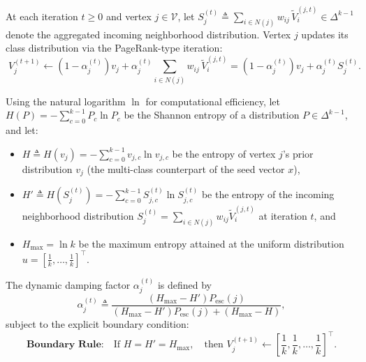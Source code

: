 \documentclass[11pt, a4paper]{article}
\theoremstyle{definition}
\theoremstyle{definition}
\begin{document}
At each iteration $t \ge 0$ and vertex $j \in \mathcal{V}$, let $S_j^{(t)} \triangleq \sum_{i \in N(j)} w_{ij}\,\tilde{V}_i^{(j,t)} \in \Delta^{k-1}$ denote the aggregated incoming neighborhood distribution. Vertex $j$ updates its class distribution via the PageRank-type iteration:
\begin{equation}\label{eq:main_update_en}
\boxed{\;V_j^{(t+1)} \leftarrow \left(1 - \alpha_j^{(t)}\right) v_j + \alpha_j^{(t)} \sum_{i \in N(j)} w_{ij}\,\tilde{V}_i^{(j,t)} = \left(1 - \alpha_j^{(t)}\right) v_j + \alpha_j^{(t)} S_j^{(t)}.\;}
\end{equation}

Using the natural logarithm $\ln$ for computational efficiency, let $H(P) = -\sum_{c=0}^{k-1} P_c \ln P_c$ be the Shannon entropy of a distribution $P \in \Delta^{k-1}$, and let:
\begin{itemize}
\item $H \triangleq H(v_j) = -\sum_{c=0}^{k-1} v_{j,c}\ln v_{j,c}$ be the entropy of vertex $j$'s prior distribution $v_j$ (the multi-class counterpart of the seed vector $x$),
\item $H' \triangleq H\!\left(S_j^{(t)}\right) = -\sum_{c=0}^{k-1} S_{j,c}^{(t)}\ln S_{j,c}^{(t)}$ be the entropy of the incoming neighborhood distribution $S_j^{(t)} = \sum_{i \in N(j)} w_{ij}\tilde{V}_i^{(j,t)}$ at iteration $t$, and
\item $H_{\max} = \ln k$ be the maximum entropy attained at the uniform distribution $u = \left[\frac{1}{k}, \dots, \frac{1}{k}\right]^\top$.
\end{itemize}

The dynamic damping factor $\alpha_j^{(t)}$ is defined by
\begin{equation}\label{eq:alpha_formula_en}
\boxed{\;\alpha_j^{(t)} \triangleq \frac{\left(H_{\max} - H'\right) P_{\mathrm{esc}}(j)}{\left(H_{\max} - H'\right) P_{\mathrm{esc}}(j) + \left(H_{\max} - H\right)},\;}
\end{equation}
subject to the explicit boundary condition:
\begin{equation}\label{eq:boundary_rule_en}
\textbf{Boundary Rule:} \quad \text{If } H = H' = H_{\max}, \quad \text{then } V_j^{(t+1)} \leftarrow \left[\frac{1}{k}, \frac{1}{k}, \dots, \frac{1}{k}\right]^\top.
\end{equation}
\end{document}
